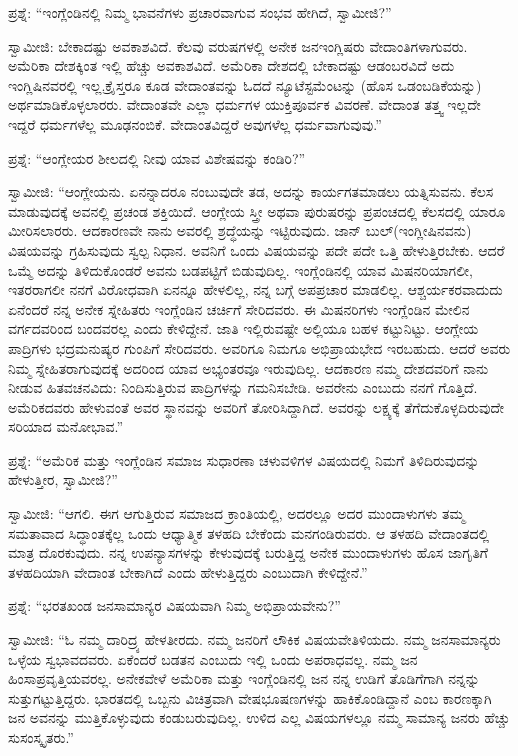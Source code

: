 ಪ್ರಶ್ನೆ: “ಇಂಗ್ಲೆಂಡಿನಲ್ಲಿ ನಿಮ್ಮ ಭಾವನೆಗಳು ಪ್ರಚಾರವಾಗುವ ಸಂಭವ ಹೇಗಿದೆ, ಸ್ವಾಮೀಜಿ?”

ಸ್ವಾಮೀಜಿ: ಬೇಕಾದಷ್ಟು ಅವಕಾಶವಿದೆ. ಕೆಲವು ವರುಷಗಳಲ್ಲಿ ಅನೇಕ ಜನ\break ಇಂಗ್ಲಿಷರು ವೇದಾಂತಿಗಳಾಗುವರು. ಅಮೆರಿಕಾ ದೇಶಕ್ಕಿಂತ ಇಲ್ಲಿ ಹೆಚ್ಚು ಅವಕಾಶವಿದೆ. ಅಮೆರಿಕಾ ದೇಶದಲ್ಲಿ ಬೇಕಾದಷ್ಟು ಆಡಂಬರವಿದೆ ಅದು ಇಂಗ್ಲಿಷಿನವರಲ್ಲಿ ಇಲ್ಲ.\break ಕ್ರೈಸ್ತರೂ ಕೂಡ ವೇದಾಂತವನ್ನು ಓದದೆ ನ್ಯೂಟೆಸ್ಟಮೆಂಟನ್ನು (ಹೊಸ ಒಡಂಬಡಿಕೆಯನ್ನು) ಅರ್ಥಮಾಡಿಕೊಳ್ಳಲಾರರು. ವೇದಾಂತವೇ ಎಲ್ಲಾ ಧರ್ಮಗಳ ಯುಕ್ತಿಪೂರ್ವಕ ವಿವರಣೆ. ವೇದಾಂತ ತತ್ತ್ವ ಇಲ್ಲದೇ ಇದ್ದರೆ ಧರ್ಮಗಳೆಲ್ಲ ಮೂಢನಂಬಿಕೆ. ವೇದಾಂತವಿದ್ದರೆ ಅವುಗಳೆಲ್ಲ ಧರ್ಮವಾಗುವುವು.”

ಪ್ರಶ್ನೆ: “ಆಂಗ್ಲೇಯರ ಶೀಲದಲ್ಲಿ ನೀವು ಯಾವ ವಿಶೇಷವನ್ನು ಕಂಡಿರಿ?”

ಸ್ವಾಮೀಜಿ: “ಆಂಗ್ಲೇಯನು. ಏನನ್ನಾದರೂ ನಂಬುವುದೇ ತಡ, ಅದನ್ನು ಕಾರ್ಯಗತಮಾಡಲು ಯತ್ನಿಸುವನು. ಕೆಲಸ ಮಾಡುವುದಕ್ಕೆ ಅವನಲ್ಲಿ ಪ್ರಚಂಡ ಶಕ್ತಿಯಿದೆ. ಆಂಗ್ಲೇಯ ಸ್ತ್ರೀ ಅಥವಾ ಪುರುಷರನ್ನು ಪ್ರಪಂಚದಲ್ಲಿ ಕೆಲಸದಲ್ಲಿ ಯಾರೂ ಮೀರಿಸಲಾರರು. ಆದಕಾರಣವೇ ನಾನು ಅವರಲ್ಲಿ ಶ್ರದ್ಧೆಯನ್ನು ಇಟ್ಟಿರುವುದು. ಜಾನ್​ ಬುಲ್​ (ಇಂಗ್ಲೀಷಿನವನು) ವಿಷಯವನ್ನು ಗ್ರಹಿಸುವುದು ಸ್ವಲ್ಪ ನಿಧಾನ. ಅವನಿಗೆ ಒಂದು ವಿಷಯವನ್ನು ಪದೇ ಪದೇ ಒತ್ತಿ ಹೇಳುತ್ತಿರಬೇಕು. ಆದರೆ ಒಮ್ಮೆ ಅದನ್ನು ತಿಳಿದುಕೊಂಡರೆ ಅವನು ಬಡಪಟ್ಟಿಗೆ ಬಿಡುವುದಿಲ್ಲ. ಇಂಗ್ಲೆಂಡಿನಲ್ಲಿ ಯಾವ ಮಿಷನರಿಯಾಗಲೀ, ಇತರರಾಗಲೀ ನನಗೆ ವಿರೋಧವಾಗಿ ಏನನ್ನೂ ಹೇಳಲಿಲ್ಲ, ನನ್ನ ಬಗ್ಗೆ ಅಪಪ್ರಚಾರ ಮಾಡಲಿಲ್ಲ. ಆಶ್ಚರ್ಯಕರವಾದುದು ಏನೆಂದರೆ ನನ್ನ ಅನೇಕ ಸ್ನೇಹಿತರು ಇಂಗ್ಲೆಂಡಿನ ಚರ್ಚಿಗೆ ಸೇರಿದವರು. ಈ ಮಿಷನರಿಗಳು ಇಂಗ್ಲೆಂಡಿನ ಮೇಲಿನ ವರ್ಗದವರಿಂದ ಬಂದವರಲ್ಲ ಎಂದು ಕೇಳಿದ್ದೇನೆ. ಜಾತಿ ಇಲ್ಲಿರುವಷ್ಟೇ ಅಲ್ಲಿಯೂ ಬಹಳ ಕಟ್ಟುನಿಟ್ಟು. ಆಂಗ್ಲೇಯ ಪಾದ್ರಿಗಳು ಭದ್ರಮನುಷ್ಯರ ಗುಂಪಿಗೆ ಸೇರಿದವರು. ಅವರಿಗೂ ನಿಮಗೂ ಅಭಿಪ್ರಾಯಭೇದ ಇರಬಹುದು. ಆದರೆ ಅವರು ನಿಮ್ಮ ಸ್ನೇಹಿತರಾಗುವುದಕ್ಕೆ ಅದರಿಂದ ಯಾವ ಅಭ್ಯಂತರವೂ ಇರುವುದಿಲ್ಲ. ಆದಕಾರಣ ನಮ್ಮ ದೇಶದವರಿಗೆ ನಾನು ನೀಡುವ ಹಿತವಚನವಿದು: ನಿಂದಿಸುತ್ತಿರುವ ಪಾದ್ರಿಗಳನ್ನು ಗಮನಿಸಬೇಡಿ. ಅವರೇನು ಎಂಬುದು ನನಗೆ ಗೊತ್ತಿದೆ. ಅಮೆರಿಕದವರು ಹೇಳುವಂತೆ ಅವರ ಸ್ಥಾನವನ್ನು ಅವರಿಗೆ ತೋರಿಸಿದ್ದಾಗಿದೆ. ಅವರನ್ನು ಲಕ್ಷ್ಯಕ್ಕೆ ತೆಗೆದುಕೊಳ್ಳದಿರುವುದೇ ಸರಿಯಾದ ಮನೋಭಾವ.”

ಪ್ರಶ್ನೆ: “ಅಮೆರಿಕ ಮತ್ತು ಇಂಗ್ಲೆಂಡಿನ ಸಮಾಜ ಸುಧಾರಣಾ ಚಳುವಳಿಗಳ ವಿಷಯದಲ್ಲಿ ನಿಮಗೆ ತಿಳಿದಿರುವುದನ್ನು ಹೇಳುತ್ತೀರ, ಸ್ವಾಮೀಜಿ?”

ಸ್ವಾಮೀಜಿ: “ಆಗಲಿ. ಈಗ ಆಗುತ್ತಿರುವ ಸಮಾಜದ ಕ್ರಾಂತಿಯಲ್ಲಿ, ಅದರಲ್ಲೂ ಅದರ ಮುಂದಾಳುಗಳು ತಮ್ಮ ಸಮತಾವಾದ ಸಿದ್ಧಾಂತಕ್ಕೆಲ್ಲ ಒಂದು ಆಧ್ಯಾತ್ಮಿಕ ತಳಹದಿ ಬೇಕೆಂದು ಮನಗಂಡಿರುವರು. ಆ ತಳಹದಿ ವೇದಾಂತದಲ್ಲಿ ಮಾತ್ರ ದೊರಕುವುದು. ನನ್ನ ಉಪನ್ಯಾಸಗಳನ್ನು ಕೇಳುವುದಕ್ಕೆ ಬರುತ್ತಿದ್ದ ಅನೇಕ ಮುಂದಾಳುಗಳು ಹೊಸ ಜಾಗೃತಿಗೆ ತಳಹದಿಯಾಗಿ ವೇದಾಂತ ಬೇಕಾಗಿದೆ ಎಂದು ಹೇಳುತ್ತಿದ್ದರು ಎಂಬುದಾಗಿ ಕೇಳಿದ್ದೇನೆ.”

\eject

ಪ್ರಶ್ನೆ: “ಭರತಖಂಡ ಜನಸಾಮಾನ್ಯರ ವಿಷಯವಾಗಿ ನಿಮ್ಮ ಅಭಿಪ್ರಾಯವೇನು?”

ಸ್ವಾಮೀಜಿ: “ಓ ನಮ್ಮ ದಾರಿದ್ರ್ಯ ಹೇಳತೀರದು. ನಮ್ಮ ಜನರಿಗೆ ಲೌಕಿಕ ವಿಷಯವೇ\break ತಿಳಿಯದು. ನಮ್ಮ ಜನಸಾಮಾನ್ಯರು ಒಳ್ಳೆಯ ಸ್ವಭಾವದವರು. ಏಕೆಂದರೆ ಬಡತನ ಎಂಬುದು ಇಲ್ಲಿ ಒಂದು ಅಪರಾಧವಲ್ಲ. ನಮ್ಮ ಜನ ಹಿಂಸಾಪ್ರವೃತ್ತಿಯವರಲ್ಲ. ಅನೇಕವೇಳೆ ಅಮೆರಿಕಾ ಮತ್ತು ಇಂಗ್ಲೆಂಡಿನಲ್ಲಿ ಜನ ನನ್ನ ಉಡಿಗೆ ತೊಡಿಗೆಗಾಗಿ ನನ್ನನ್ನು ಸುತ್ತುಗಟ್ಟುತ್ತಿದ್ದರು. ಭಾರತದಲ್ಲಿ ಒಬ್ಬನು ವಿಚಿತ್ರವಾಗಿ ವೇಷಭೂಷಣಗಳನ್ನು ಹಾಕಿಕೊಂಡಿದ್ದಾನೆ ಎಂಬ ಕಾರಣಕ್ಕಾಗಿ ಜನ ಅವನನ್ನು ಮುತ್ತಿಕೊಳ್ಳುವುದು ಕಂಡುಬರುವುದಿಲ್ಲ. ಉಳಿದ ಎಲ್ಲ ವಿಷಯಗಳಲ್ಲೂ ನಮ್ಮ ಸಾಮಾನ್ಯ ಜನರು ಹೆಚ್ಚು ಸುಸಂಸ್ಕೃತರು.”

